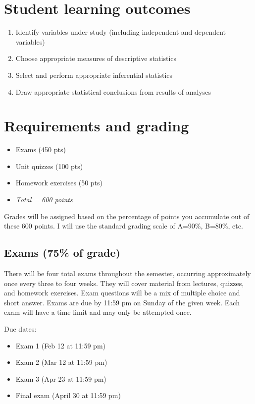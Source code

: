 \documentclass[10pt]{article}
\begin{document}
\section*{Student learning outcomes}
\label{sec-4}
\begin{enumerate}
\item Identify variables under study (including independent and dependent variables)
\item Choose appropriate measures of descriptive statistics
\item Select and perform appropriate inferential statistics
\item Draw appropriate statistical conclusions from results of analyses
\end{enumerate}

\section*{Requirements and grading}
\label{sec-5}
\begin{itemize}
\item Exams (450 pts)
\item Unit quizzes (100 pts)
\item Homework exercises (50 pts)
\item \emph{Total = 600 points}
\end{itemize}

Grades will be assigned based on the percentage of points you accumulate out of these 600 points.  I will use the standard grading scale of A=90\%, B=80\%, etc.

\subsection*{Exams (75\% of grade)}
\label{sec-5-1}
There will be four total exams throughout the semester, occurring 
approximately once every three to four weeks.  They will cover material 
from lectures, quizzes, and homework exercises.  Exam questions will be a mix of multiple choice and short answer.  Exams are due by 11:59 pm on 
Sunday of the given week.  Each exam will have a time limit and may only 
be attempted once.

Due dates:

\begin{itemize}
\item Exam 1 (Feb 12 at 11:59 pm)
\item Exam 2 (Mar 12 at 11:59 pm)
\item Exam 3 (Apr 23 at 11:59 pm)
\item Final exam (April 30 at 11:59 pm)
\end{itemize}
\end{document}
